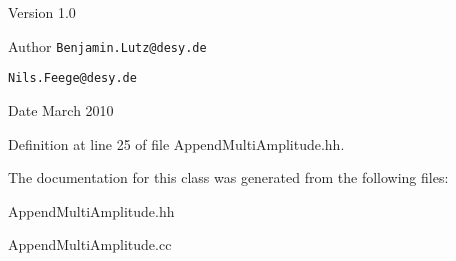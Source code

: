 \begin{DoxyVersion}{Version}
1.0 
\end{DoxyVersion}
\begin{DoxyAuthor}{Author}
{\tt Benjamin.Lutz@desy.de} 

{\tt Nils.Feege@desy.de} 
\end{DoxyAuthor}
\begin{DoxyDate}{Date}
March 2010 
\end{DoxyDate}


Definition at line 25 of file AppendMultiAmplitude.hh.

The documentation for this class was generated from the following files:\begin{DoxyCompactItemize}
\item 
AppendMultiAmplitude.hh\item 
AppendMultiAmplitude.cc\end{DoxyCompactItemize}
